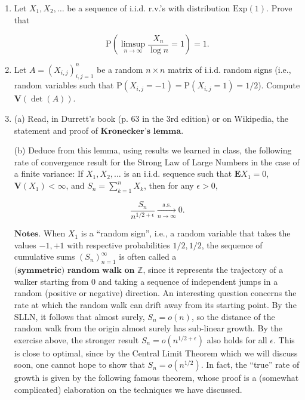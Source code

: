 \begin{enumerate}[label=\arabic*.]
\noindent $\textbf{Hint.}$ Assume without loss of generality
that $\mathbf{E} X=0$. For any $a>0$, we have that
$\mathrm{P}(X\ge t) \le \mathrm{P}((X+a)^2\ge
(a+t)^2)$.
Bound this using known methods and then look for the
value of $a$ that gives the best bound.

\item Let $X_1,X_2,\ldots$ be a sequence of i.i.d. r.v.'s
with distribution $\textrm{Exp}(1)$. Prove that

\[
\mathrm{P}\left( \limsup_{n\to\infty} \frac{X_n}{\log n} = 1\right) = 1.
\]

\item Let $A=(X_{i,j})_{i,j=1}^n$ be a random $n\times n$
matrix of i.i.d. random signs (i.e., random variables
such that
$\mathrm{P}(X_{i,j}=-1) = \mathrm{P}(X_{i,j}=1)=1/2$).
Compute $\mathbf{V}(\det(A))$.

\item (a) Read, in Durrett's book (p. 63 in the 3rd
edition) or on Wikipedia, the statement and proof of
$\textbf{Kronecker's lemma}$.

(b) Deduce from this lemma, using results we learned
in class, the following rate of convergence result for
the Strong Law of Large Numbers in the case of a
finite variance: If $X_1, X_2, \ldots$ is an i.i.d.
sequence such that $\mathbf{E} X_1 = 0$,
$\mathbf{V}(X_1)<\infty$, and $S_n=\sum_{k=1}^n X_k$,
then for any $\epsilon>0$,

\[
\frac{S_n}{n^{1/2+\epsilon}} \xrightarrow[n\to\infty]{\textrm{a.s.}} 0.
\]

\noindent $\textbf{Notes.}$ When $X_1$ is a ``random sign'',
i.e., a random variable that takes the values $-1,+1$
with respective probabilities $1/2,1/2$, the sequence
of cumulative sums $(S_n)_{n=1}^\infty$ is often
called a
$\textbf{(symmetric) random walk on } \mathbb{Z}$,
since it represents the trajectory of a walker
starting from 0 and taking a sequence of independent
jumps in a random (positive or negative) direction. An
interesting question concerns the rate at which the
random walk can drift away from its starting point. By
the SLLN, it follows that almost surely, $S_n = o(n)$,
so the distance of the random walk from the origin
almost surely has sub-linear growth. By the exercise
above, the stronger result $S_n = o(n^{1/2+\epsilon})$
also holds for all $\epsilon$. This is close to
optimal, since by the Central Limit Theorem which we
will discuss soon, one cannot hope to show that
$S_n = o(n^{1/2})$. In fact, the ``true'' rate of
growth is given by the following famous theorem, whose
proof is a (somewhat complicated) elaboration on the
techniques we have discussed.


\end{enumerate}
